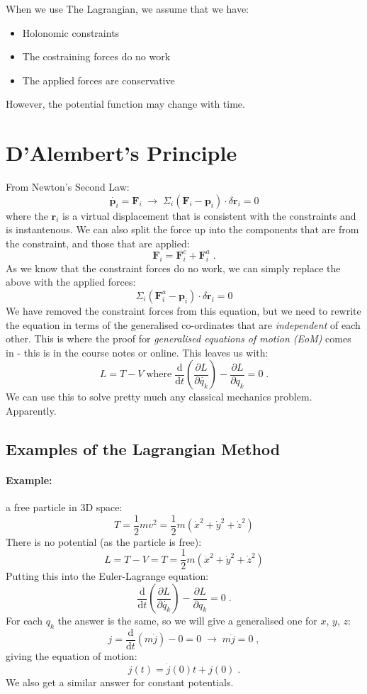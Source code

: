 When we use The Lagrangian, we assume that we have:
\begin{itemize}
	\item Holonomic constraints
	\item The costraining forces do no work
	\item The applied forces are conservative
\end{itemize}
However, the potential function may change with time.

\section{D'Alembert's Principle}
From Newton's Second Law:
$$
	\dot{\bm{p}_i} = \bm{F}_i \; \rightarrow \;
	\Sigma_i (\bm{F}_i - \bm{p}_i)\cdot\delta \bm{r}_i = 0
$$
where the $\bm{r}_i$ is a virtual displacement that is consistent with the
constraints and is instantenous. We can also split the force up into the
components that are from the constraint, and those that are applied:
$$
	\bm{F}_i = \bm{F}^c_i + \bm{F}^a_i \; .
$$
As we know that the constraint forces do no work, we can simply replace the
above with the applied forces:
$$
	\Sigma_i (\bm{F}^a_i - \bm{p}_i)\cdot\delta \bm{r}_i = 0
$$
We have removed the constraint forces from this equation, but we need to rewrite
the equation in terms of the generalised co-ordinates that are
\emph{independent} of each other. This is where the proof for \emph{generalised
equations of motion (EoM)} comes in - this is in the course notes or online.
This leaves us with:
$$
	L = T - V \; \mathrm{where} \; \frac{\mathrm{d}}{\mathrm{d}t}
	\left(\frac{\partial L}{\partial \dot{q_k}}\right) - 
	\frac{\partial L}{\partial q_k} = 0\;.
$$
We can use this to solve pretty much any classical mechanics problem.
Apparently.

\subsection{Examples of the Lagrangian Method}
\paragraph{Example:} a free particle in 3D space:
$$
	T = \frac{1}{2}mv^2 = \frac{1}{2} m (\dot{x}^2 + \dot{y}^2 + \dot{z}^2)
$$
There is no potential (as the particle is free):
$$
	L = T - V = T = \frac{1}{2} m (\dot{x}^2 + \dot{y}^2 + \dot{z}^2)
$$
Putting this into the Euler-Lagrange equation:
$$
	\frac{\mathrm{d}}{\mathrm{d}t}
	\left(\frac{\partial L}{\partial \dot{q_k}}\right) - 
	\frac{\partial L}{\partial q_k} = 0\;.
$$
For each $q_k$ the answer is the same, so we will give a generalised one for
$x$, $y$, $z$:
$$
	j = \frac{\mathrm{d}}{\mathrm{d}t} (m \dot{j}) - 0 = 0
	\; \rightarrow \;
	m \ddot {j} = 0 \; ,
$$
giving the equation of motion:
$$
	j(t) = \dot{j}(0)t + j(0) \; .
$$
We also get a similar answer for constant potentials.

